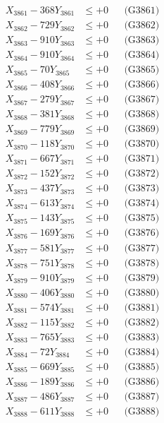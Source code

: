 \documentclass[a4paper,10pt]{article}
\begin{document}
{\begin{align}
\allowbreak
X_{3861} - 368Y_{3861} &\leq +0 && \text{(G3861)} \\
X_{3862} - 729Y_{3862} &\leq +0 && \text{(G3862)} \\
X_{3863} - 910Y_{3863} &\leq +0 && \text{(G3863)} \\
X_{3864} - 910Y_{3864} &\leq +0 && \text{(G3864)} \\
X_{3865} - 70Y_{3865} &\leq +0 && \text{(G3865)} \\
X_{3866} - 408Y_{3866} &\leq +0 && \text{(G3866)} \\
X_{3867} - 279Y_{3867} &\leq +0 && \text{(G3867)} \\
X_{3868} - 381Y_{3868} &\leq +0 && \text{(G3868)} \\
X_{3869} - 779Y_{3869} &\leq +0 && \text{(G3869)} \\
X_{3870} - 118Y_{3870} &\leq +0 && \text{(G3870)} \\
\allowbreak
X_{3871} - 667Y_{3871} &\leq +0 && \text{(G3871)} \\
X_{3872} - 152Y_{3872} &\leq +0 && \text{(G3872)} \\
X_{3873} - 437Y_{3873} &\leq +0 && \text{(G3873)} \\
X_{3874} - 613Y_{3874} &\leq +0 && \text{(G3874)} \\
X_{3875} - 143Y_{3875} &\leq +0 && \text{(G3875)} \\
X_{3876} - 169Y_{3876} &\leq +0 && \text{(G3876)} \\
X_{3877} - 581Y_{3877} &\leq +0 && \text{(G3877)} \\
X_{3878} - 751Y_{3878} &\leq +0 && \text{(G3878)} \\
X_{3879} - 910Y_{3879} &\leq +0 && \text{(G3879)} \\
X_{3880} - 406Y_{3880} &\leq +0 && \text{(G3880)} \\
\allowbreak
X_{3881} - 574Y_{3881} &\leq +0 && \text{(G3881)} \\
X_{3882} - 115Y_{3882} &\leq +0 && \text{(G3882)} \\
X_{3883} - 765Y_{3883} &\leq +0 && \text{(G3883)} \\
X_{3884} - 72Y_{3884} &\leq +0 && \text{(G3884)} \\
X_{3885} - 669Y_{3885} &\leq +0 && \text{(G3885)} \\
X_{3886} - 189Y_{3886} &\leq +0 && \text{(G3886)} \\
X_{3887} - 486Y_{3887} &\leq +0 && \text{(G3887)} \\
X_{3888} - 611Y_{3888} &\leq +0 && \text{(G3888)} \\

\end{align}}
\end{document}
